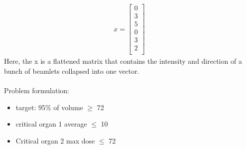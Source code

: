 \begin{align}
  x = 
  \begin{bmatrix}
     0 \\
     3 \\
     5 \\
     0 \\
     3 \\
     2 \\
  \end{bmatrix}
\end{align} 
Here, the x is a flattened matrix that contains the intensity and direction of a bunch of beamlets collapsed into one vector.
\\ \\
Problem formulation:
\begin{itemize}
  \item target: 95\% of volume $\geq$ 72
  \item critical organ 1 average $\leq$ 10
  \item Critical organ 2 max dose $\leq$ 72
\end{itemize}
